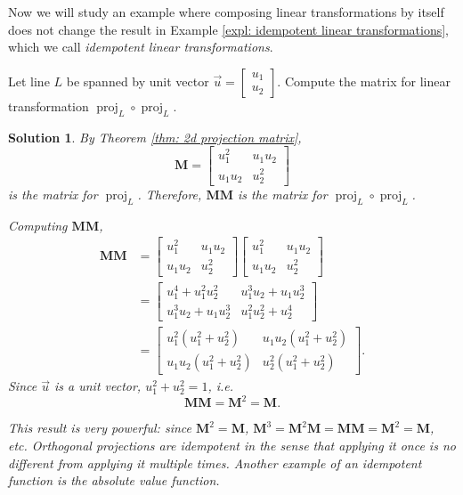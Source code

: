 \documentclass[]{book}
\DeclareMathOperator{\proj}{proj}
\newcommand{\vecxx}[1][x]{\ensuremath{\begin{bmatrix}
#1_1 \\
#1_2
\end{bmatrix}}}
\newcommand{\mat}[1]{\ensuremath{\mathbf{#1}}}
\newtheorem*{solution}{Solution}
\begin{document}
Now we will study an example where composing linear transformations by itself does not change the result in Example \ref{expl: idempotent linear transformations}, which we call \textit{idempotent linear transformations}.
\begin{example}
    \label{expl: idempotent linear transformations}
    Let line $L$ be spanned by unit vector $\vec{u} = \vecxx[u]$. Compute the matrix for linear transformation $\proj_L \circ \proj_L$.
\begin{solution}
    By Theorem \ref{thm: 2d projection matrix},  $$\mat{M} = \begin{bmatrix} u_1^2 & u_1u_2 \\ u_1u_2 & u_2^2 \end{bmatrix}$$ is the matrix for $\proj_L$. Therefore, $\mat{M}\mat{M}$ is the matrix for $\proj_L \circ \proj_L$. 
    
    Computing $\mat{M}\mat{M}$,
    \begin{align*}
        \mat{M}\mat{M} &= \begin{bmatrix} u_1^2 & u_1u_2 \\ u_1u_2 & u_2^2 \end{bmatrix} \begin{bmatrix} u_1^2 & u_1u_2 \\ u_1u_2 & u_2^2 \end{bmatrix} \\
        &= \begin{bmatrix}u_1^4 + u_1^2u_2^2 & u_1^3u_2 + u_1u_2^3 \\
        u_1^3u_2 + u_1u_2^3 & u_1^2u_2^2 + u_2^4\end{bmatrix} \\
        &= \begin{bmatrix}u_1^2(u_1^2 + u_2^2) & u_1u_2(u_1^2 + u_2^2) \\
        u_1u_2(u_1^2 + u_2^2) & u_2^2(u_1^2+u_2^2)\end{bmatrix}.
    \end{align*}
    Since $\vec{u}$ is a unit vector, $u_1^2 + u_2^2 = 1$, i.e. 
    \[\mat{M}\mat{M} = \mat{M}^2 = \mat{M}.\]
    
    This result is very powerful: since $\mat{M}^2 = \mat{M}$, $\mat{M}^3 = \mat{M}^2\mat{M} = \mat{M}\mat{M} = \mat{M}^2 = \mat{M}$, etc. Orthogonal projections are idempotent in the sense that applying it once is no different from applying it multiple times. Another example of an idempotent function is the absolute value function. \hfill \qedsymbol
\end{solution}
\end{example}
\end{document}
